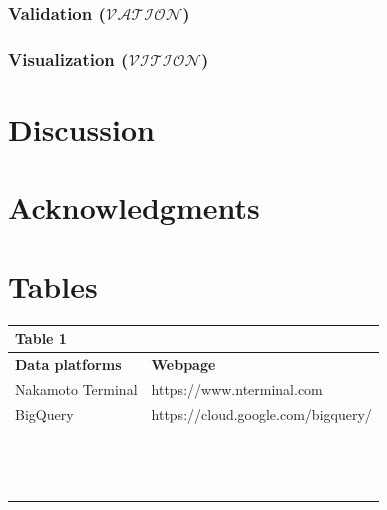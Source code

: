 \documentclass[english,12pt]{article}
\begin{document}
\subsubsection{Validation ($\mathcal{VATION}$)}

\subsubsection{Visualization ($\mathcal{VITION}$)}


\section{Discussion}


\newpage
\section{Acknowledgments}


\newpage



\newpage

\section{Tables}
\begin{center}
\begin{tabular}{  p{5cm}  |  p{13cm} }
\hline
Table 1 & \textbf{}\\  \hline
  \textbf{Data platforms} & \textbf{Webpage}\\  \hline
        Nakamoto Terminal & https://www.nterminal.com \\ \hline
        BigQuery & https://cloud.google.com/bigquery/ \\ \hline
         & \\ \hline
         & \\ \hline
         & \\ \hline        
         & \\ \hline
         & \\ \hline 
         & \\ \hline        
         & \\ \hline
         & \\ \hline
         & \\ \hline
         & \\ \hline
         & \\ \hline
         & \\ \hline
         & \\ \hline
         & \\ \hline
        
\bottomrule
\end{tabular}
\end{center}
\end{document}
